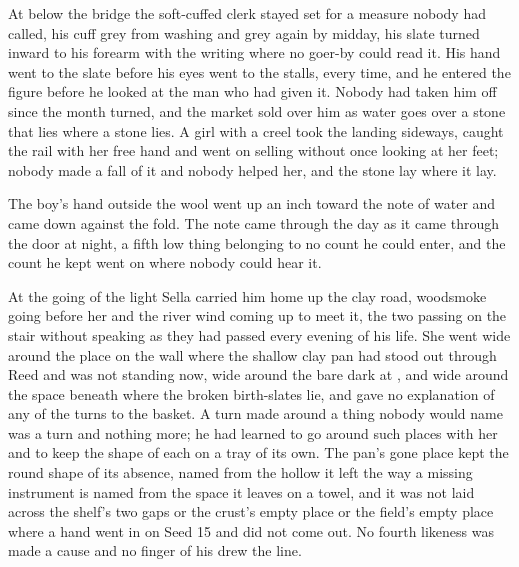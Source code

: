 At  below the bridge the soft-cuffed clerk stayed set for a measure nobody had called, his cuff grey from washing and grey again by midday, his slate turned inward to his forearm with the writing where no goer-by could read it. His hand went to the slate before his eyes went to the stalls, every time, and he entered the figure before he looked at the man who had given it. Nobody had taken him off since the month turned, and the market sold over him as water goes over a stone that lies where a stone lies. A girl with a creel took the landing sideways, caught the rail with her free hand and went on selling without once looking at her feet; nobody made a fall of it and nobody helped her, and the stone lay where it lay.

The boy's hand outside the wool went up an inch toward the note of water and came down against the fold. The note came through the day as it came through the door at night, a fifth low thing belonging to no count he could enter, and the count he kept went on where nobody could hear it.

\scenebreak

At the going of the light Sella carried him home up the clay road, woodsmoke going before her and the river wind coming up to meet it, the two passing on the stair without speaking as they had passed every evening of his life. She went wide around the place on the wall where the shallow clay pan had stood out through Reed and was not standing now, wide around the bare dark  at , and wide around the space beneath  where the broken birth-slates lie, and gave no explanation of any of the turns to the basket. A turn made around a thing nobody would name was a turn and nothing more; he had learned to go around such places with her and to keep the shape of each on a tray of its own. The pan's gone place kept the round shape of its absence, named from the hollow it left the way a missing instrument is named from the space it leaves on a towel, and it was not laid across the shelf's two gaps or the crust's empty place or the field's empty place where a hand went in on Seed 15 and did not come out. No fourth likeness was made a cause and no finger of his drew the line.

